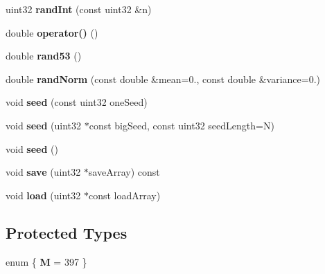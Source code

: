 \begin{DoxyCompactItemize}
\item 
\hypertarget{class_picto_1_1_m_t_rand_a10a3d40daa5cb2d4508dee71dbcb1dbf}{uint32 {\bfseries rand\-Int} (const uint32 \&n)}\label{class_picto_1_1_m_t_rand_a10a3d40daa5cb2d4508dee71dbcb1dbf}

\item 
\hypertarget{class_picto_1_1_m_t_rand_ab6d1992749b511a146a4e9916e4b1b1e}{double {\bfseries operator()} ()}\label{class_picto_1_1_m_t_rand_ab6d1992749b511a146a4e9916e4b1b1e}

\item 
\hypertarget{class_picto_1_1_m_t_rand_acc6974caf60a990318c25c6c533f3b67}{double {\bfseries rand53} ()}\label{class_picto_1_1_m_t_rand_acc6974caf60a990318c25c6c533f3b67}

\item 
\hypertarget{class_picto_1_1_m_t_rand_afed2de150fc48a7ddd92221b7949c07a}{double {\bfseries rand\-Norm} (const double \&mean=0., const double \&variance=0.)}\label{class_picto_1_1_m_t_rand_afed2de150fc48a7ddd92221b7949c07a}

\item 
\hypertarget{class_picto_1_1_m_t_rand_ae66c45202692deae5f94156959b7069c}{void {\bfseries seed} (const uint32 one\-Seed)}\label{class_picto_1_1_m_t_rand_ae66c45202692deae5f94156959b7069c}

\item 
\hypertarget{class_picto_1_1_m_t_rand_ae8afeb974398dd0b3251ddba47307a2d}{void {\bfseries seed} (uint32 $\ast$const big\-Seed, const uint32 seed\-Length=N)}\label{class_picto_1_1_m_t_rand_ae8afeb974398dd0b3251ddba47307a2d}

\item 
\hypertarget{class_picto_1_1_m_t_rand_a63d70e1948e57315bbb895ed5c0f61f8}{void {\bfseries seed} ()}\label{class_picto_1_1_m_t_rand_a63d70e1948e57315bbb895ed5c0f61f8}

\item 
\hypertarget{class_picto_1_1_m_t_rand_a2cfa48762889820d8f2a4cace4e57db5}{void {\bfseries save} (uint32 $\ast$save\-Array) const }\label{class_picto_1_1_m_t_rand_a2cfa48762889820d8f2a4cace4e57db5}

\item 
\hypertarget{class_picto_1_1_m_t_rand_aba3dff6aa3fe4dbea5b2d097c05cc522}{void {\bfseries load} (uint32 $\ast$const load\-Array)}\label{class_picto_1_1_m_t_rand_aba3dff6aa3fe4dbea5b2d097c05cc522}

\end{DoxyCompactItemize}
\subsection*{Protected Types}
\begin{DoxyCompactItemize}
\item 
enum \{ {\bfseries M} = 397
 \}
\end{DoxyCompactItemize}

